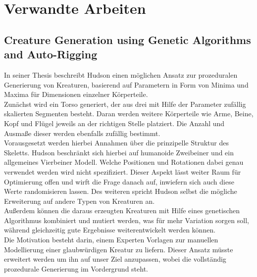 \chapter{Verwandte Arbeiten}
\label{Verwandte_Arbeiten}


\section{Creature Generation using Genetic Algorithms and Auto-Rigging\cite{Hudson2013CreatureGU}}
In seiner Thesis beschreibt Hudson einen möglichen Ansatz zur prozeduralen Generierung von Kreaturen, basierend auf Parametern in Form von Minima und Maxima für Dimensionen einzelner Körperteile.\\ Zunächst wird ein Torso generiert, der aus drei mit Hilfe der Parameter zufällig skalierten Segmenten besteht. Daran werden weitere Körperteile wie Arme, Beine, Kopf und Flügel jeweils an der richtigen Stelle platziert. Die Anzahl und Ausmaße dieser werden ebenfalls zufällig bestimmt.\\
Vorausgesetzt werden hierbei Annahmen über die prinzipelle Struktur des Skeletts. Hudson beschränkt sich hierbei auf humanoide Zweibeiner und ein allgemeines Vierbeiner Modell. Welche Positionen und Rotationen dabei genau verwendet werden wird nicht spezifiziert. Dieser Aspekt lässt weiter Raum für Optimierung offen und wirft die Frage danach auf, inwiefern sich auch diese Werte randomisieren lassen. Des weiteren spricht Hudson selbst die mögliche Erweiterung auf andere Typen von Kreaturen an.\\
Außerdem können die daraus erzeugten Kreaturen mit Hilfe eines genetischen Algorithmus kombiniert und mutiert werden, was für mehr Variation sorgen soll, während gleichzeitig gute Ergebnisse weiterentwickelt werden können.\\
Die Motivation besteht darin, einem Experten Vorlagen zur manuellen Modellierung einer glaubwürdigen Kreatur zu liefern. Dieser Ansatz müsste erweitert werden um ihn auf unser Ziel anzupassen, wobei die vollständig prozedurale Generierung im Vordergrund steht.

